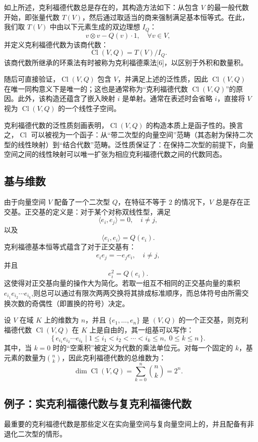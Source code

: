 如上所述，克利福德代数总是存在的，其构造方法如下：从包含 $V$ 的最一般代数开始，即张量代数 $T(V)$，然后通过取适当的商来强制满足基本恒等式。在此，我们取 $T(V)$ 中由以下元素生成的双边理想 $I_Q$：
$$
v \otimes v - Q(v) \cdot 1, \quad \forall v \in V,~
$$
并定义克利福德代数为该商代数：
$$
\operatorname{Cl}(V, Q) = T(V) / I_Q.~
$$
该商代数所继承的环乘法有时被称为克利福德乘法[6]，以区别于外积和数量积。

随后可直接验证，$\operatorname{Cl}(V, Q)$ 包含 $V$，并满足上述的泛性质，因此 $\operatorname{Cl}(V, Q)$ 在唯一同构意义下是唯一的；这也是通常称为“克利福德代数 $\operatorname{Cl}(V, Q)$”的原因。此外，该构造还蕴含了嵌入映射 $i$ 是单射。通常在表述时会省略 $i$，直接将 $V$ 视为 $\operatorname{Cl}(V, Q)$ 的一个线性子空间。

克利福德代数的泛性质刻画表明，$\operatorname{Cl}(V, Q)$ 的构造本质上是函子性的。换言之，$\operatorname{Cl}$ 可以被视为一个函子：从“带二次型的向量空间”范畴（其态射为保持二次型的线性映射）到“结合代数”范畴。泛性质保证了：在保持二次型的前提下，向量空间之间的线性映射可以唯一扩张为相应克利福德代数之间的代数同态。
\subsection{基与维数}
由于向量空间 $V$ 配备了一个二次型 $Q$，在特征不等于 $2$ 的情况下，$V$ 总是存在正交基。正交基的定义是：对于某个对称双线性型，满足
$$
\langle e_i, e_j \rangle = 0, \quad i \neq j,~
$$
以及
$$
\langle e_i, e_i \rangle = Q(e_i).~
$$
克利福德基本恒等式蕴含了对于正交基有：
$$
e_i e_j = - e_j e_i, \quad i \neq j,~
$$
并且
$$
e_i^2 = Q(e_i).~
$$
这使得对正交基向量的操作大为简化。若取一组互不相同的正交基向量的乘积$e_{i_1} e_{i_2} \cdots e_{i_k}$,则总可以通过有限次两两交换将其排成标准顺序，而总体符号由所需交换次数的奇偶性（即置换的符号）决定。

设 $V$ 在域 $K$ 上的维数为 $n$，并且 $\{e_1, \ldots, e_n\}$ 是 $(V, Q)$ 的一个正交基，则克利福德代数 $\operatorname{Cl}(V, Q)$ 在 $K$ 上是自由的，其一组基可以写作：
$$
\big\{\, e_{i_1} e_{i_2} \cdots e_{i_k} \;\big|\; 1 \leq i_1 < i_2 < \cdots < i_k \leq n, \; 0 \leq k \leq n \,\big\}.~
$$
其中，当 $k = 0$ 时的“空乘积”被定义为代数的乘法单位元。对每一个固定的 $k$，基元素的数量为$\binom{n}{k}$，因此克利福德代数的总维数为：
$$
\dim \operatorname{Cl}(V, Q) = \sum_{k=0}^n \binom{n}{k} = 2^n.~
$$
\subsection{例子：实克利福德代数与复克利福德代数}
最重要的克利福德代数是那些定义在实向量空间与复向量空间上的，并且配备有非退化二次型的情形。

